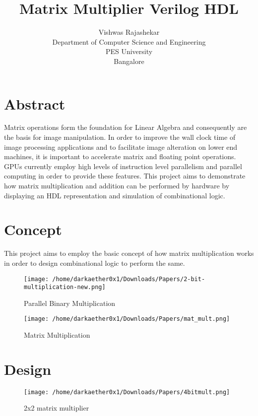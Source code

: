 \documentclass[12pt]{report}
\title{\textbf{Matrix Multiplier Verilog HDL}}
\author{Vishwas Rajashekar \\
Department of Computer Science and Engineering \\
PES University\\
Bangalore}
\date{}
\begin{document}
\maketitle

\section{Abstract}
Matrix operations form the foundation for Linear Algebra and consequently are the basis for image manipulation. In order to improve the wall clock time of image processing applications and to facilitate image alteration on lower end machines, it is important to accelerate matrix and floating point operations.
GPUs currently employ high levels of instruction level parallelism and parallel computing in order to provide these features.
This project aims to demonstrate how matrix multiplication and addition can be performed by hardware by displaying an HDL representation and simulation of combinational logic.

\section{Concept}
This project aims to employ the basic concept of how matrix multiplication works in order to design combinational logic to perform the same.
\begin{figure}[htp]
\centering
\texttt{[image: /home/darkaether0x1/Downloads/Papers/2-bit-multiplication-new.png]}
\caption{Parallel Binary Multiplication \cite{binmult}}
\label{}
\end{figure}
\begin{figure}[htp]
\centering
\texttt{[image: /home/darkaether0x1/Downloads/Papers/mat\_mult.png]}
\caption{Matrix Multiplication}
\label{}
\end{figure}
\section{Design}
\newpage
\vfill
\begin{figure}[htp]
\centering
\texttt{[image: /home/darkaether0x1/Downloads/Papers/4bitmult.png]}
\caption{2x2 matrix multiplier}
\label{}
\end{figure}
\end{document}
